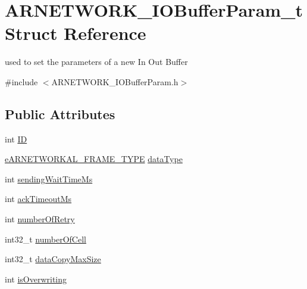 \hypertarget{struct_a_r_n_e_t_w_o_r_k___i_o_buffer_param__t}{}\section{A\+R\+N\+E\+T\+W\+O\+R\+K\+\_\+\+I\+O\+Buffer\+Param\+\_\+t Struct Reference}
\label{struct_a_r_n_e_t_w_o_r_k___i_o_buffer_param__t}


used to set the parameters of a new In Out Buffer  




{\ttfamily \#include $<$A\+R\+N\+E\+T\+W\+O\+R\+K\+\_\+\+I\+O\+Buffer\+Param.\+h$>$}

\subsection*{Public Attributes}
\begin{DoxyCompactItemize}
\item 
int \hyperlink{struct_a_r_n_e_t_w_o_r_k___i_o_buffer_param__t_a5337d70765bf4efaf7393926828f287c}{ID}
\item 
\hyperlink{_a_r_n_e_t_w_o_r_k_a_l___frame_8h_aee43e1c38faf96b7cfb53b02e9150750}{e\+A\+R\+N\+E\+T\+W\+O\+R\+K\+A\+L\+\_\+\+F\+R\+A\+M\+E\+\_\+\+T\+Y\+PE} \hyperlink{struct_a_r_n_e_t_w_o_r_k___i_o_buffer_param__t_a6bba59e3d9ff2380f642302103b4d09a}{data\+Type}
\item 
int \hyperlink{struct_a_r_n_e_t_w_o_r_k___i_o_buffer_param__t_a4d4a2b5f38f2386ad05649defba5cc71}{sending\+Wait\+Time\+Ms}
\item 
int \hyperlink{struct_a_r_n_e_t_w_o_r_k___i_o_buffer_param__t_addba140ff9ca65ed07b271aedbbda9cf}{ack\+Timeout\+Ms}
\item 
int \hyperlink{struct_a_r_n_e_t_w_o_r_k___i_o_buffer_param__t_a74823dab6716f0216fe44f927584d968}{number\+Of\+Retry}
\item 
int32\+\_\+t \hyperlink{struct_a_r_n_e_t_w_o_r_k___i_o_buffer_param__t_aa4cee3d931cbae916e7b0f71d60fe6ba}{number\+Of\+Cell}
\item 
int32\+\_\+t \hyperlink{struct_a_r_n_e_t_w_o_r_k___i_o_buffer_param__t_a308f4f73ba7ce16c4f5541289c79ed9e}{data\+Copy\+Max\+Size}
\item 
int \hyperlink{struct_a_r_n_e_t_w_o_r_k___i_o_buffer_param__t_a2c51e69b46c0a8074113e82895b9bc7f}{is\+Overwriting}
\end{DoxyCompactItemize}


